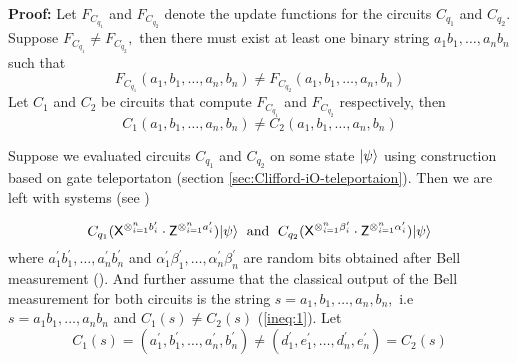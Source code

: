 \begin{flushleft}
{\bf Proof:} Let $F_{C_{q_1}}$ and $F_{C_{q_2}}$ denote the update functions for the circuits $C_{q_1}$ and $C_{q_2}.$ Suppose $F_{C_{q_1}}\neq F_{C_{q_2}},$  then there must exist at least one binary string $a_1b_1,\ldots, a_nb_n$ such that
\begin{equation}
\label{fun:assumption1}
F_{C_{q_1}}(a_1,b_1,\ldots,a_n,b_n)\neq F_{C_{q_2}}(a_1,b_1,\ldots,a_n,b_n)
\end{equation}
Let $C_1$ and $C_2$ be circuits that compute $F_{C_{q_1}}$ and $F_{C_{q_2}}$ respectively, then
\begin{equation}
\label{ineq:1}
C_1(a_1,b_1,\ldots,a_n,b_n)\neq C_2(a_1,b_1,\ldots,a_n,b_n)
\end{equation}



Suppose we evaluated circuits $C_{q_1}$ and $C_{q_2}$ on some state ${\lvert}\psi\rangle$ using construction based on gate teleportaton (section \ref{sec:Clifford-iO-teleportaion}). Then we are left with systems  (see )%

 \begin{equation}
  \label{eq:2}
C_{q_1} ({\sf X}^{\otimes_{i=1}^{n} b_{i}^\prime} \cdot {\sf Z}^{\otimes_{i=1}^{n}a_{i}^\prime}){\lvert}\psi\rangle \;\mbox{ and }\;
C_{q_2} ({\sf X}^{\otimes_{i=1}^{n} \beta_{i}^\prime} \cdot {\sf Z}^{\otimes_{i=1}^{n}\alpha_{i}^\prime}){\lvert}\psi\rangle
\end{equation}
where $a_1^\prime b_1^\prime,\ldots, a_n^\prime b_n^\prime$ and $\alpha_1^\prime \beta_1^\prime,\ldots, \alpha_n^\prime \beta_n^\prime$ are random bits obtained after Bell measurement ().   And further assume that the classical output of the Bell measurement for both circuits is the string  $s=a_1,b_1,\ldots,a_n,b_n,$ i.e  $s=a_1b_1,\ldots, a_nb_n$ and  $C_1(s)\neq C_2(s)$ (\ref{ineq:1}). Let
 \begin{equation}
 \label{eq:3}
C_1(s)=(a^\prime_1,b^\prime_1,\ldots, a^\prime_n,b^\prime_n)\neq(d_1^\prime,e_1^\prime,\ldots, d_n^\prime,e^\prime_n)=C_2(s)
\end{equation}




\end{flushleft}
